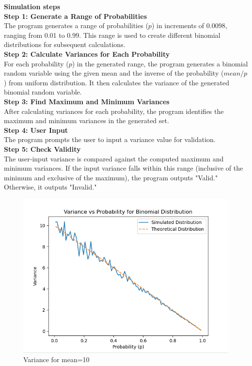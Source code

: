 \documentclass[journal,12pt,twocolumn]{IEEEtran}
\begin{document}
\textbf{Simulation steps}\\
\textbf{Step 1: Generate a Range of Probabilities}\\
The program generates a range of probabilities (\(p\)) in increments of 0.0098, ranging from 0.01 to 0.99. This range is used to create different binomial distributions for subsequent calculations.
\\
\textbf{Step 2: Calculate Variances for Each Probability}\\
For each probability (\(p\)) in the generated range, the program generates a binomial random variable using the given mean and the inverse of the probability (\(mean/p\)) from uniform distribution. It then calculates the variance of the generated binomial random variable.\\
\textbf{Step 3: Find Maximum and Minimum Variances}\\
After calculating variances for each probability, the program identifies the maximum and minimum variances in the generated set.\\
\textbf{Step 4: User Input}\\
The program prompts the user to input a variance value for validation.
\\
\textbf{Step 5: Check Validity}\\
The user-input variance is compared against the computed maximum and minimum variances. If the input variance falls within this range (inclusive of the minimum and exclusive of the maximum), the program outputs "Valid." Otherwise, it outputs "Invalid."
\begin{figure}[ht!]
    \centering
    \includegraphics[width=\columnwidth]{./codes/ss10.png}
    \caption{Variance for mean=10}
    \label{fig:ss10}
\end{figure}

	

	
\end{document}

